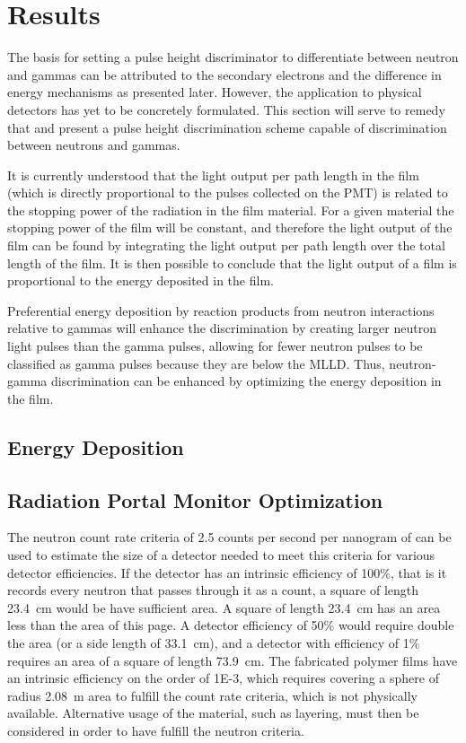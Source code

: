 \chapter{Results}
\label{chap:results}

The basis for setting a pulse height discriminator to differentiate between neutron and gammas can be attributed to the secondary electrons and the difference in energy mechanisms as presented later.
However, the application to physical detectors has yet to be concretely formulated.
This section will serve to remedy that and present a pulse height discrimination scheme capable of discrimination between neutrons and gammas.

It is currently understood that the light output per path length in the film (which is directly proportional to the pulses collected on the PMT) is related to the stopping power of the radiation in the film material.
For a given material the stopping power of the film will be constant, and therefore the light output of the film can be found by integrating the light output per path length over the total length of the film.
It is then possible to conclude that the light output of a film is proportional to the energy deposited in the film.

Preferential energy deposition by reaction products from neutron interactions relative to gammas will enhance the discrimination by creating larger neutron light pulses than the gamma pulses, allowing for fewer neutron pulses to be classified as gamma pulses because they are below the MLLD.
Thus, neutron-gamma discrimination can be enhanced by optimizing the energy deposition in the film. 

\section{Energy Deposition}


\section{Radiation Portal Monitor Optimization}

The neutron count rate criteria of 2.5 counts per second per nanogram of  can be used to estimate the size of a detector needed to meet this criteria for various detector efficiencies. 
If the detector has an intrinsic efficiency of 100\%, that is it records every neutron that passes through it as a count, a square of length \SI{23.4}{\cm} would be have sufficient area.
A square of length \SI{23.4}{\cm} has an area less than the area of this page.
A detector efficiency of 50\% would require double the area (or a side length of \SI{33.1}{\cm}), and a detector with efficiency of 1\% requires an area of a square of length \SI{73.9}{\cm}.
The fabricated polymer films have an intrinsic efficiency on the order of \num{1E-3}, which requires covering a sphere of radius \SI{2.08}{\m} area to fulfill the count rate criteria, which is not physically available.
Alternative usage of the material, such as layering, must then be considered in order to have fulfill the neutron criteria.

